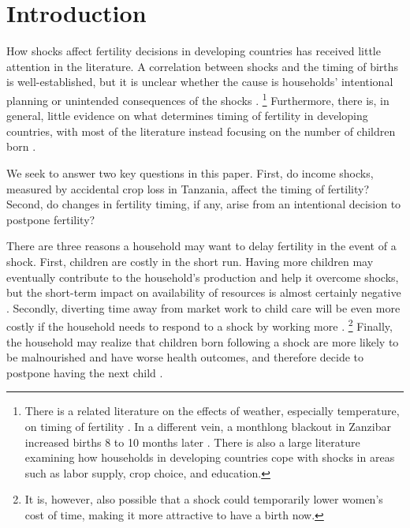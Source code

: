 \documentclass[letterpaper,12pt]{article}
\begin{document}
\newpage


\section{Introduction}

How shocks affect fertility decisions in developing countries has 
received little attention in the literature.
A correlation between shocks and the timing of births is well-established, but it is 
unclear whether the cause is households' intentional planning or unintended consequences 
of the shocks \citep{pitt98b,lindstrom99,Evans2010,Portner2014}.%
\footnote{
There is a related literature on the effects of weather, especially temperature,
on timing of fertility \citep[see, for example,][]{Barreca2015}.
In a different vein, a monthlong blackout in Zanzibar increased 
births 8 to 10 months later \citep{Burlando2014}.
There is also a large literature examining how households in developing countries
cope with shocks in areas such as labor supply, crop choice, and education.
}
Furthermore, there is, in general, little evidence on what determines timing 
of fertility in developing countries, with most of the literature instead 
focusing on the number of children born \citep{Portner2018}.

We seek to answer two key questions in this paper.
First, do income shocks, measured by accidental crop loss in Tanzania, affect the
timing of fertility?
Second, do changes in fertility timing, if any, arise from an intentional decision
to postpone fertility?

There are three reasons a household may want to delay fertility in the
event of a shock.
First, children are costly in the short run.
Having more children may eventually contribute to the household's production 
and help it overcome shocks, but the short-term impact on availability 
of resources is almost certainly negative \citep{Portner2014}.
Secondly, diverting time away from market work to child care will be even more 
costly if the household needs to respond to a shock by working more \citep{kochar99}.%
\footnote{
It is, however, also possible that a shock could temporarily lower women's 
cost of time, making it more attractive to have a birth now.
}
Finally, the household may realize that children born following a shock 
are more likely to be malnourished and have worse health outcomes, and therefore 
decide to postpone having the next child \citep{Portner2010}.
\end{document}
